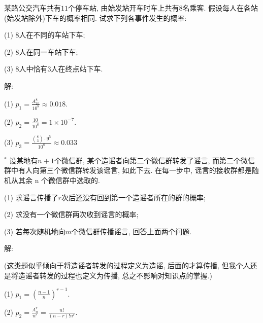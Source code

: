 \documentclass[standard]{ExBook}
\begin{document}
\begin{qitems}
\vspace{-5em}

    \begin{bbox}
    \begin{shaded}
        \qitem
某路公交汽车共有$11$个停车站, 由始发站开车时车上共有8名乘客. 假设每人在各站(始发站除外)下车的概率相同. 试求下列各事件发生的概率:

(1) 8人在不同的车站下车;

(2) 8人在同一车站下车;

(3) 8人中恰有3人在终点站下车.
    \end{shaded}
    \end{bbox}

\vspace{-5em}

    \begin{bbox}
解: 

(1) $p_{1}=\frac{A_{10}^{8}}{10^8}\approx0.018$.

(2) $p_{2}=\frac{10}{10^8}=1\times10^{-7}$.

(3) $p_{3}=\frac{\binom{8}{3}\cdot 9^5}{10^8}\approx0.033$
    \end{bbox}

\vspace{-5em}

    \begin{bbox}
    \begin{shaded}
        \qitem$^{*}$
设某地有$n + 1$个微信群, 某个造谣者向第二个微信群转发了谣言, 而第二个微信群中有人向第三个微信群转发该谣言, 如此下去. 在每一步中, 谣言的接收群都是随机从其余 n 个微信群中选取的.

(1) 求谣言传播了$r$次后还没有回到第一个造谣者所在的群的概率;

(2) 求没有一个微信群两次收到谣言的概率;

(3) 若每次随机地向$m$个微信群传播谣言, 回答上面两个问题.
    \end{shaded}
    \end{bbox}

\vspace{-5em}

    \begin{bbox}
解: 

(这类题似乎倾向于将造谣者转发的过程定义为造谣, 后面的才算传播, 但我个人还是将造谣者转发的过程也定义为传播, 总之不影响对知识点的掌握.)

(1) $p_{1}=(\frac{n-1}{n})^{r-1}$.

(2) $p_{2}=\frac{A_{n}^{r}}{n^r}=\frac{n!}{(n-r)!n^r}$.


\end{bbox}
\end{qitems}
\end{document}
